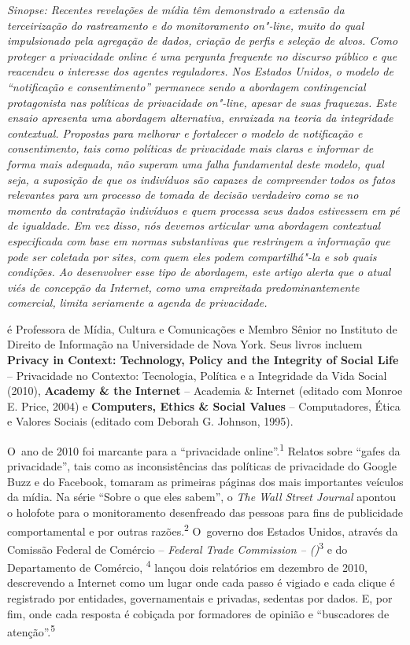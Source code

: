 \emph{Sinopse: Recentes revelações de mídia têm demonstrado a extensão
da terceirização do rastreamento e do monitoramento on"-line, muito do
qual impulsionado pela agregação de dados, criação de perfis e seleção
de alvos. Como proteger a privacidade online é uma pergunta frequente no
discurso público e que reacendeu o interesse dos agentes reguladores.
Nos Estados Unidos, o modelo de ``notificação e consentimento''
permanece sendo a abordagem contingencial protagonista nas políticas de
privacidade on"-line, apesar de suas fraquezas. Este ensaio apresenta uma
abordagem alternativa, enraizada na teoria da integridade contextual.
Propostas para melhorar e fortalecer o modelo de notificação e
consentimento, tais como políticas de privacidade mais claras e informar
de forma mais adequada, não superam uma falha fundamental deste modelo,
qual seja, a suposição de que os indivíduos são capazes de compreender
todos os fatos relevantes para um processo de tomada de decisão
verdadeiro como se no momento da contratação indivíduos e quem processa
seus dados estivessem em pé de igualdade. Em vez disso, nós devemos
articular uma abordagem contextual especificada com base em normas
substantivas que restringem a informação que pode ser coletada por
sites, com quem eles podem compartilhá"-la e sob quais condições. Ao
desenvolver esse tipo de abordagem, este artigo alerta que o atual viés
de concepção da Internet, como uma empreitada predominantemente
comercial, limita seriamente a agenda de privacidade.}

  é Professora de Mídia, Cultura e Comunicações e Membro
Sênior no Instituto de Direito de Informação na Universidade de Nova
York. Seus livros incluem \textbf{Privacy in Context: Technology, Policy
and the Integrity of Social Life} -- Privacidade no Contexto: Tecnologia,
Política e a Integridade da Vida Social (2010), \textbf{Academy \& the
Internet} -- Academia \& Internet (editado com Monroe E. Price, 2004) e
\textbf{Computers, Ethics \& Social Values} -- Computadores, Ética e
Valores Sociais (editado com Deborah G. Johnson, 1995).

O~ano de 2010 foi marcante para a ``privacidade
online''.\textsuperscript{{1}} Relatos sobre ``gafes da privacidade'',
tais como as inconsistências das políticas de privacidade do Google Buzz
e do Facebook, tomaram as primeiras páginas dos mais importantes
veículos da mídia. Na série ``Sobre o que eles sabem'', o \emph{The Wall
Street Journal} apontou o holofote para o monitoramento desenfreado das
pessoas para fins de publicidade comportamental e por outras
razões.\textsuperscript{{2}} O~governo dos Estados Unidos, através da
Comissão Federal de Comércio -- \emph{Federal Trade Commission --
()}\textsuperscript{{3}} e do Departamento de Comércio,
\textsuperscript{{4}} lançou dois relatórios em dezembro de 2010,
descrevendo a Internet como um lugar onde cada passo é vigiado e cada
clique é registrado por entidades, governamentais e privadas, sedentas
por dados. E, por fim, onde cada resposta é cobiçada por formadores de
opinião e ``buscadores de atenção''.\textsuperscript{{5}}

